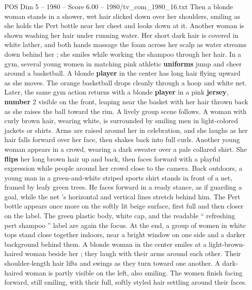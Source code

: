 \begin{textsample}{POS Dim 5 – 1980 – Score 6.00 – 1980/tv\_com\_1980\_16.txt}
Then a blonde woman stands in a shower, wet hair slicked down over her shoulders, smiling as she holds the Pert bottle near her chest and looks down at it.
Another woman is shown washing her hair under running water.
Her short dark hair is covered in white lather, and both hands massage the foam across her scalp as water streams down behind her ; she smiles while working the shampoo through her hair.
In a gym, several young women in matching pink athletic \textbf{uniforms} jump and cheer around a basketball.
A blonde \textbf{player} in the center has long hair flying upward as she moves.
The orange basketball drops cleanly through a hoop and white net.
Later, the same gym action returns with a blonde \textbf{player} in a pink \textbf{jersey}, \textbf{number} 2 visible on the front, leaping near the basket with her hair thrown back as she raises the ball toward the rim.
A lively group scene follows.
A woman with curly brown hair, wearing white, is surrounded by smiling men in light-colored jackets or shirts.
Arms are raised around her in celebration, and she laughs as her hair falls forward over her face, then shakes back into full curls.
Another young woman appears in a crowd, wearing a dark sweater over a pale collared shirt.
She \textbf{flips} her long brown hair up and back, then faces forward with a playful expression while people around her crowd close to the camera.
Back outdoors, a young man in a green-and-white striped sports shirt stands in front of a net, framed by leafy green trees.
He faces forward in a ready stance, as if guarding a goal, while the net ’s horizontal and vertical lines stretch behind him.
The Pert bottle appears once more on the softly lit beige surface, first full and then closer on the label.
The green plastic body, white cap, and the readable “ refreshing pert shampoo ” label are again the focus.
At the end, a group of women in white tops stand close together indoors, near a bright window on one side and a darker background behind them.
A blonde woman in the center smiles at a light-brown-haired woman beside her ; they laugh with their arms around each other.
Their shoulder-length hair lifts and swings as they turn toward one another.
A dark-haired woman is partly visible on the left, also smiling.
The women finish facing forward, still smiling, with their full, softly styled hair settling around their faces.

\end{textsample}
